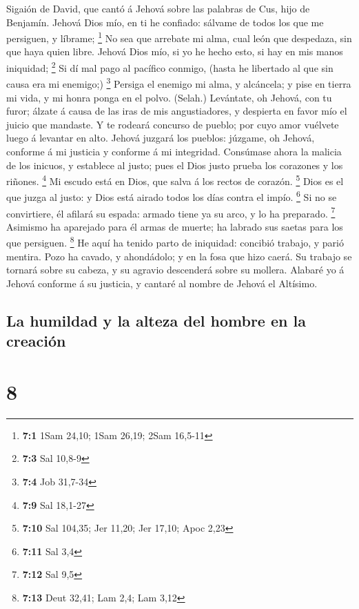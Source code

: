  Sigaión de David, que cantó á Jehová sobre las palabras de
Cus, hijo de Benjamín. Jehová Dios mío, en ti he confiado: sálvame de
todos los que me persiguen, y líbrame; \footnote{\textbf{7:1} 1Sam
  24,10; 1Sam 26,19; 2Sam 16,5-11}  No sea que arrebate mi
alma, cual león que despedaza, sin que haya quien libre. 
Jehová Dios mío, si yo he hecho esto, si hay en mis manos iniquidad;
\footnote{\textbf{7:3} Sal 10,8-9}  Si dí mal pago al
pacífico conmigo, (hasta he libertado al que sin causa era mi enemigo;)
\footnote{\textbf{7:4} Job 31,7-34}  Persiga el enemigo mi
alma, y alcáncela; y pise en tierra mi vida, y mi honra ponga en el
polvo. (Selah.)  Levántate, oh Jehová, con tu furor; álzate
á causa de las iras de mis angustiadores, y despierta en favor mío el
juicio que mandaste.  Y te rodeará concurso de pueblo; por
cuyo amor vuélvete luego á levantar en alto.  Jehová juzgará
los pueblos: júzgame, oh Jehová, conforme á mi justicia y conforme á mi
integridad.  Consúmase ahora la malicia de los inicuos, y
establece al justo; pues el Dios justo prueba los corazones y los
riñones. \footnote{\textbf{7:9} Sal 18,1-27}  Mi escudo
está en Dios, que salva á los rectos de corazón. \footnote{\textbf{7:10}
  Sal 104,35; Jer 11,20; Jer 17,10; Apoc 2,23}  Dios es el
que juzga al justo: y Dios está airado todos los días contra el impío.
\footnote{\textbf{7:11} Sal 3,4}  Si no se convirtiere, él
afilará su espada: armado tiene ya su arco, y lo ha preparado.
\footnote{\textbf{7:12} Sal 9,5}  Asimismo ha aparejado
para él armas de muerte; ha labrado sus saetas para los que persiguen.
\footnote{\textbf{7:13} Deut 32,41; Lam 2,4; Lam 3,12}  He
aquí ha tenido parto de iniquidad: concibió trabajo, y parió mentira.
 Pozo ha cavado, y ahondádolo; y en la fosa que hizo caerá.
 Su trabajo se tornará sobre su cabeza, y su agravio
descenderá sobre su mollera.  Alabaré yo á Jehová conforme
á su justicia, y cantaré al nombre de Jehová el Altísimo.

\hypertarget{la-humildad-y-la-alteza-del-hombre-en-la-creaciuxf3n}{%
\subsection{La humildad y la alteza del hombre en la
creación}\label{la-humildad-y-la-alteza-del-hombre-en-la-creaciuxf3n}}

\hypertarget{section-7}{%
\section{8}\label{section-7}}

